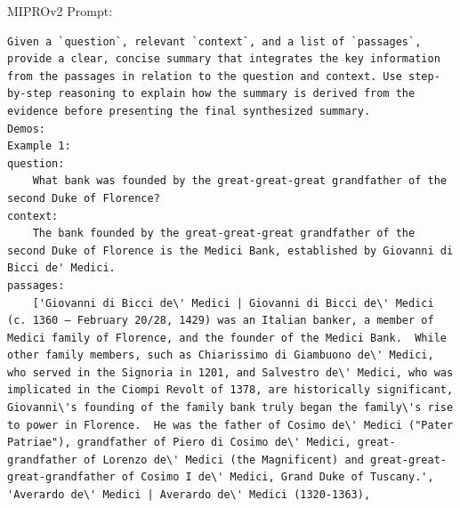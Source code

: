 \begin{instructbox}
MIPROv2 Prompt:
\begin{lstlisting}[breakindent=0pt, breaklines=true, breakatwhitespace=true, frame=single, backgroundcolor=\color{green!10}]
Given a `question`, relevant `context`, and a list of `passages`, provide a clear, concise summary that integrates the key information from the passages in relation to the question and context. Use step-by-step reasoning to explain how the summary is derived from the evidence before presenting the final synthesized summary.
Demos:
Example 1:
question:
    What bank was founded by the great-great-great grandfather of the second Duke of Florence?
context:
    The bank founded by the great-great-great grandfather of the second Duke of Florence is the Medici Bank, established by Giovanni di Bicci de' Medici.
passages:
    ['Giovanni di Bicci de\' Medici | Giovanni di Bicci de\' Medici (c. 1360 – February 20/28, 1429) was an Italian banker, a member of Medici family of Florence, and the founder of the Medici Bank.  While other family members, such as Chiarissimo di Giambuono de\' Medici, who served in the Signoria in 1201, and Salvestro de\' Medici, who was implicated in the Ciompi Revolt of 1378, are historically significant, Giovanni\'s founding of the family bank truly began the family\'s rise to power in Florence.  He was the father of Cosimo de\' Medici ("Pater Patriae"), grandfather of Piero di Cosimo de\' Medici, great-grandfather of Lorenzo de\' Medici (the Magnificent) and great-great-great-grandfather of Cosimo I de\' Medici, Grand Duke of Tuscany.', 'Averardo de\' Medici | Averardo de\' Medici (1320-1363), 

\end{lstlisting}
\end{instructbox}
